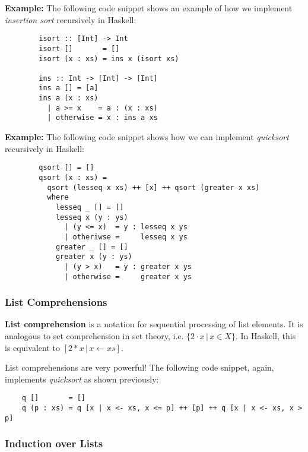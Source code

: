 \documentclass[a4paper]{extarticle}
\begin{document}
\begin{ebox}
    \textbf{Example:} The following code snippet shows an example of how we implement \textit{insertion sort} recursively in Haskell:

    \begin{verbatim}
        isort :: [Int] -> Int
        isort []       = []
        isort (x : xs) = ins x (isort xs)

        ins :: Int -> [Int] -> [Int]
        ins a [] = [a]
        ins a (x : xs)
          | a >= x    = a : (x : xs)
          | otherwise = x : ins a xs
    \end{verbatim}
\end{ebox}

\begin{ebox}
    \textbf{Example:} The following code snippet shows how we can implement \textit{quicksort} recursively in Haskell:

    \begin{verbatim}
        qsort [] = []
        qsort (x : xs) =
          qsort (lesseq x xs) ++ [x] ++ qsort (greater x xs)
          where
            lesseq _ [] = []
            lesseq x (y : ys)
              | (y <= x)  = y : lesseq x ys
              | otheriwse =     lesseq x ys
            greater _ [] = []
            greater x (y : ys)
              | (y > x)   = y : greater x ys
              | otherwise =     greater x ys
    \end{verbatim}
\end{ebox}

\subsubsection{List Comprehensions}

\textbf{List comprehension} is a notation for sequential processing of list elements. It is analogous to set comprehension in set theory, i.e. \(\{2 \cdot x \, | \, x \in X\}\). In Haskell, this is equivalent to \([2 * x \, | \, x \leftarrow xs]\).

List comprehensions are very powerful! The following code snippet, again, implements \textit{quicksort} as shown previously:

\begin{verbatim}
    q []       = []
    q (p : xs) = q [x | x <- xs, x <= p] ++ [p] ++ q [x | x <- xs, x > p]
\end{verbatim}

\subsubsection{Induction over Lists}
\end{document}
